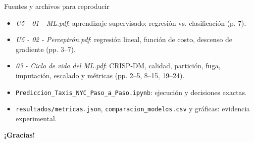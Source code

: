 \documentclass[aspectratio=169,11pt]{beamer}
\begin{document}
\begin{frame}{Fuentes y archivos para reproducir}
\small
\begin{itemize}
\item \emph{U5 - 01 - ML.pdf}: aprendizaje supervisado; regresión vs. clasificación (p. 7).
\item \emph{U5 - 02 - Perceptrón.pdf}: regresión lineal, función de costo, descenso de gradiente (pp. 3--7).
\item \emph{03 - Ciclo de vida del ML.pdf}: CRISP-DM, calidad, partición, fuga, imputación, escalado y métricas (pp. 2--5, 8--15, 19--24).
\item \texttt{Prediccion\_Taxis\_NYC\_Paso\_a\_Paso.ipynb}: ejecución y decisiones exactas.
\item \texttt{resultados/metricas.json}, \texttt{comparacion\_modelos.csv} y gráficas: evidencia experimental.
\end{itemize}
\vspace{2mm}
\begin{center}\Large\textbf{¡Gracias!}\end{center}
\end{frame}
\end{document}
